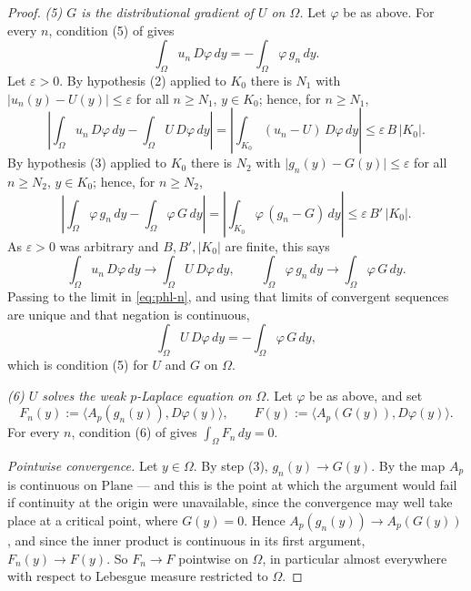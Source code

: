 \begin{proof}
\medskip\noindent\emph{(5) $G$ is the distributional gradient of $U$ on $\Omega$.}
Let $\varphi$ be as above.  For every $n$, condition (5) of  gives
\begin{equation}\label{eq:phl-n}
  \int_\Omega u_n\,D\varphi\,dy=-\int_\Omega \varphi\,g_n\,dy .
\end{equation}
Let $\varepsilon>0$.  By hypothesis (2) applied to $K_0$ there is $N_1$ with
$\lvert u_n(y)-U(y)\rvert\le\varepsilon$ for all $n\ge N_1$, $y\in K_0$; hence, for $n\ge N_1$,
\[
  \left\lvert\int_\Omega u_n\,D\varphi\,dy-\int_\Omega U\,D\varphi\,dy\right\rvert
  =\left\lvert\int_{K_0}(u_n-U)\,D\varphi\,dy\right\rvert
  \le\varepsilon\,B\,\lvert K_0\rvert .
\]
By hypothesis (3) applied to $K_0$ there is $N_2$ with
$\lvert g_n(y)-G(y)\rvert\le\varepsilon$ for all $n\ge N_2$, $y\in K_0$; hence, for $n\ge N_2$,
\[
  \left\lvert\int_\Omega \varphi\,g_n\,dy-\int_\Omega \varphi\,G\,dy\right\rvert
  =\left\lvert\int_{K_0}\varphi\,(g_n-G)\,dy\right\rvert
  \le\varepsilon\,B'\,\lvert K_0\rvert .
\]
As $\varepsilon>0$ was arbitrary and $B,B',\lvert K_0\rvert$ are finite, this says
\[
  \int_\Omega u_n\,D\varphi\,dy\longrightarrow\int_\Omega U\,D\varphi\,dy,
  \qquad
  \int_\Omega \varphi\,g_n\,dy\longrightarrow\int_\Omega \varphi\,G\,dy .
\]
Passing to the limit in \eqref{eq:phl-n}, and using that limits of convergent sequences are
unique and that negation is continuous,
\[
  \int_\Omega U\,D\varphi\,dy=-\int_\Omega \varphi\,G\,dy ,
\]
which is condition (5) for $U$ and $G$ on $\Omega$.

\medskip\noindent\emph{(6) $U$ solves the weak $p$-Laplace equation on $\Omega$.}
Let $\varphi$ be as above, and set
\[
  F_n(y):=\bigl\langle A_p(g_n(y)),D\varphi(y)\bigr\rangle,\qquad
  F(y):=\bigl\langle A_p(G(y)),D\varphi(y)\bigr\rangle .
\]
For every $n$, condition (6) of  gives $\int_\Omega F_n\,dy=0$.

\emph{Pointwise convergence.}  Let $y\in\Omega$.  By step (3), $g_n(y)\to G(y)$.  By
 the map $A_p$ is continuous on $\mathrm{Plane}$ --- and this is the
point at which the argument would fail if continuity at the origin were unavailable, since the
convergence may well take place at a critical point, where $G(y)=0$.  Hence
$A_p(g_n(y))\to A_p(G(y))$, and since the inner product is continuous in its first argument,
$F_n(y)\to F(y)$.  So $F_n\to F$ pointwise on $\Omega$, in particular almost everywhere with
respect to Lebesgue measure restricted to $\Omega$.


\end{proof}

